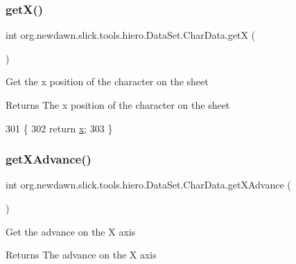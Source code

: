 \subsubsection{\texorpdfstring{get\+X()}{getX()}}
{\footnotesize\ttfamily int org.\+newdawn.\+slick.\+tools.\+hiero.\+Data\+Set.\+Char\+Data.\+getX (\begin{DoxyParamCaption}{ }\end{DoxyParamCaption})\hspace{0.3cm}{\ttfamily [inline]}}

Get the x position of the character on the sheet

\begin{DoxyReturn}{Returns}
The x position of the character on the sheet 
\end{DoxyReturn}

\begin{DoxyCode}
301                           \{
302             \textcolor{keywordflow}{return} \mbox{\hyperlink{classorg_1_1newdawn_1_1slick_1_1tools_1_1hiero_1_1_data_set_1_1_char_data_a78da82c8566e1eefdc8a7c93526d3a33}{x}};          
303         \}
\end{DoxyCode}
\mbox{\label{classorg_1_1newdawn_1_1slick_1_1tools_1_1hiero_1_1_data_set_1_1_char_data_afbf008c2341bc8f9f3db61b508031236}} 
\subsubsection{\texorpdfstring{get\+X\+Advance()}{getXAdvance()}}
{\footnotesize\ttfamily int org.\+newdawn.\+slick.\+tools.\+hiero.\+Data\+Set.\+Char\+Data.\+get\+X\+Advance (\begin{DoxyParamCaption}{ }\end{DoxyParamCaption})\hspace{0.3cm}{\ttfamily [inline]}}

Get the advance on the X axis

\begin{DoxyReturn}{Returns}
The advance on the X axis 
\end{DoxyReturn}

